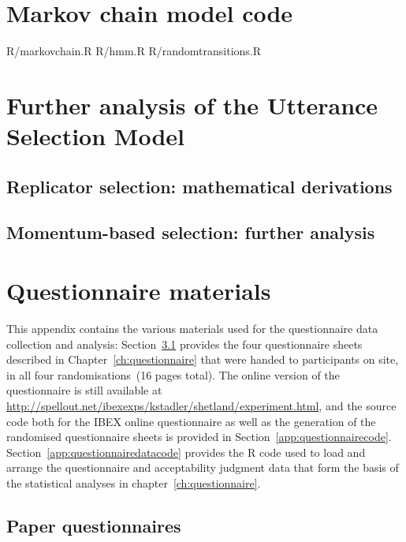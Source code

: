 \documentclass[oneside]{book}
\newcommand{\includeR}[1]{#1}
\begin{document}
\chapter{Markov chain model code}
\label{app:markovmodel}
\includeR{R/markovchain.R}
\includeR{R/hmm.R}
\includeR{R/randomtransitions.R}

\chapter[Further analysis of the USM]{Further analysis of the Utterance Selection Model}
\label{app:math}

\section{Replicator selection: mathematical derivations}
%

\section{Momentum-based selection: further analysis}
%

\chapter{Questionnaire materials}
\label{app:questionnaire}
This appendix contains the various materials used for the questionnaire data collection and analysis: Section~\ref{app:paperquestionnaire} provides the four questionnaire sheets described in Chapter~\ref{ch:questionnaire} that were handed to participants on site, in all four randomisations~(16 pages total). The online version of the questionnaire is still available at \url{http://spellout.net/ibexexps/kstadler/shetland/experiment.html}, and the source code both for the IBEX online questionnaire as well as the generation of the randomised questionnaire sheets is provided in Section~\ref{app:questionnairecode}. Section~\ref{app:questionnairedatacode} provides the R code used to load and arrange the questionnaire and acceptability judgment data that form the basis of the statistical analyses in chapter~\ref{ch:questionnaire}.

\section{Paper questionnaires}
\label{app:paperquestionnaire}
%
%
\end{document}
